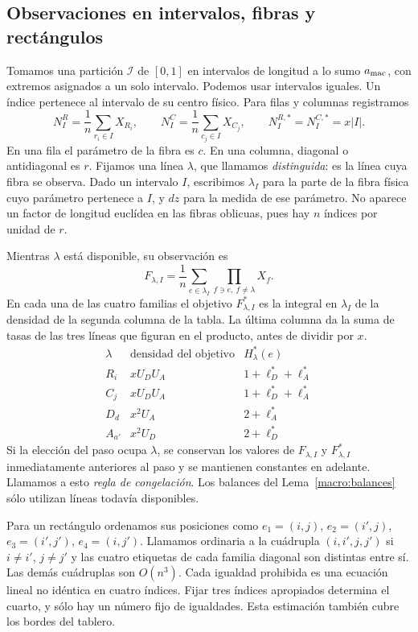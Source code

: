 \subsection{Observaciones en intervalos, fibras y rectángulos}\label{macro:observaciones}

Tomamos una partición $\mathcal I$ de $[0,1]$ en intervalos de longitud a lo sumo $a_{\rm mac}$, con
extremos
asignados a un solo intervalo. Podemos usar intervalos iguales. Un índice pertenece al intervalo de su
centro físico. Para filas y columnas registramos
\[
 N^R_I=\frac1n\sum_{r_i\in I}X_{R_i},\qquad
 N^C_I=\frac1n\sum_{c_j\in I}X_{C_j},\qquad
 N^{R,*}_I=N^{C,*}_I=x|I|.
\]
En una fila el parámetro de la fibra es $c$. En una columna, diagonal o antidiagonal es $r$. Fijamos
una línea $\lambda$, que llamamos \emph{distinguida}: es la línea cuya fibra se observa. Dado un
intervalo $I$, escribimos $\lambda_I$ para la parte de la fibra física cuyo parámetro pertenece a
$I$, y $dz$ para la medida de ese parámetro. No aparece un factor de
longitud euclídea en las fibras oblicuas, pues hay $n$ índices por unidad de $r$.

\begin{definicion}\label{macro:fibras}
Mientras $\lambda$ está disponible, su observación es
\[
 F_{\lambda,I}=\frac1n\sum_{e\in\lambda_I}
                  \prod_{f\ni e,\ f\ne\lambda}X_f .
\]
En cada una de las cuatro familias el objetivo $F^*_{\lambda,I}$ es la integral en $\lambda_I$ de la
densidad de la segunda columna de la tabla. La última columna da la suma de tasas de las tres líneas
que figuran en el producto, antes de dividir por $x$.
\[
\begin{array}{c|c|c}
 \lambda & \text{densidad del objetivo} & H^*_{\lambda}(e)\\ \hline
 R_i & xU_DU_A  & 1+\ell_D^*+\ell_A^*\\
 C_j & xU_DU_A  & 1+\ell_D^*+\ell_A^*\\
 D_d & x^2U_A   & 2+\ell_A^*\\
 A_{a'} & x^2U_D & 2+\ell_D^*
\end{array}
\]
Si la elección del paso ocupa $\lambda$, se conservan los valores de $F_{\lambda,I}$ y
$F^*_{\lambda,I}$ inmediatamente anteriores al paso y se mantienen constantes en adelante. Llamamos
a esto \emph{regla de congelación}. Los balances del Lema~\ref{macro:balances} sólo utilizan líneas
todavía disponibles.
\end{definicion}

Para un rectángulo ordenamos sus posiciones como
$e_1=(i,j)$, $e_2=(i',j)$, $e_3=(i',j')$, $e_4=(i,j')$.
Llamamos ordinaria a la cuádrupla $(i,i',j,j')$ si $i\ne i'$, $j\ne j'$ y las cuatro etiquetas de cada
familia diagonal son distintas entre sí. Las demás cuádruplas son $O(n^3)$. Cada igualdad prohibida es
una ecuación lineal no idéntica en cuatro índices. Fijar tres índices apropiados determina el cuarto,
y sólo hay un número fijo de igualdades. Esta estimación también cubre los bordes del tablero.

